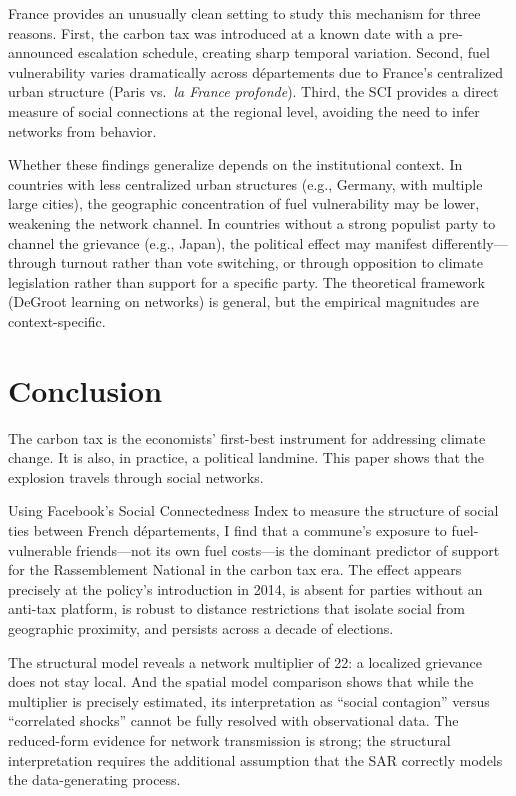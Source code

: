 \documentclass[12pt]{article}
\newcommand{\rn}{Rassemblement National}
\newcommand{\depts}{d\'{e}partements}
\begin{document}
France provides an unusually clean setting to study this mechanism for three reasons. First, the carbon tax was introduced at a known date with a pre-announced escalation schedule, creating sharp temporal variation. Second, fuel vulnerability varies dramatically across \depts{} due to France's centralized urban structure (Paris vs.\ \textit{la France profonde}). Third, the SCI provides a direct measure of social connections at the regional level, avoiding the need to infer networks from behavior.

Whether these findings generalize depends on the institutional context. In countries with less centralized urban structures (e.g., Germany, with multiple large cities), the geographic concentration of fuel vulnerability may be lower, weakening the network channel. In countries without a strong populist party to channel the grievance (e.g., Japan), the political effect may manifest differently---through turnout rather than vote switching, or through opposition to climate legislation rather than support for a specific party. The theoretical framework (DeGroot learning on networks) is general, but the empirical magnitudes are context-specific.



\section{Conclusion}
\label{sec:conclusion}

The carbon tax is the economists' first-best instrument for addressing climate change. It is also, in practice, a political landmine. This paper shows that the explosion travels through social networks.

Using Facebook's Social Connectedness Index to measure the structure of social ties between French \depts{}, I find that a commune's exposure to fuel-vulnerable friends---not its own fuel costs---is the dominant predictor of support for the \rn{} in the carbon tax era. The effect appears precisely at the policy's introduction in 2014, is absent for parties without an anti-tax platform, is robust to distance restrictions that isolate social from geographic proximity, and persists across a decade of elections.

The structural model reveals a network multiplier of 22: a localized grievance does not stay local. And the spatial model comparison shows that while the multiplier is precisely estimated, its interpretation as ``social contagion'' versus ``correlated shocks'' cannot be fully resolved with observational data. The reduced-form evidence for network transmission is strong; the structural interpretation requires the additional assumption that the SAR correctly models the data-generating process.
\end{document}

